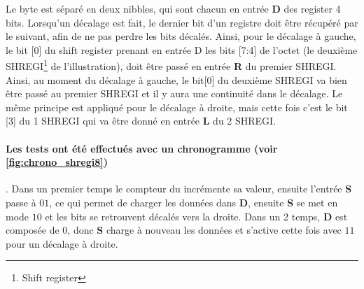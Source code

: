 \documentclass[a4paper]{article} %
\begin{document}
\begin{tcolorbox}[colframe=Monokaimagenta,colback=white]
Le byte est séparé en deux nibbles, qui sont chacun en entrée \textbf{D} des register 4 bits.
Lorsqu'un décalage est fait, le dernier bit d'un registre doit être récupéré par le suivant, afin de ne pas perdre les bits décalés. Ainsi, pour le décalage à gauche, le bit [0] du shift register prenant en entrée D les bits [7:4] de l'octet (le deuxième SHREGI\footnote{Shift register} de l'illustration), doit être passé en entrée \textbf{R} du premier SHREGI. Ainsi, au moment du décalage à gauche, le bit[0] du deuxième SHREGI va bien être passé au premier SHREGI et il y aura une continuité dans le décalage.
Le même principe est appliqué pour le décalage à droite, mais cette fois c'est le bit [3] du 1 SHREGI qui va être donné en entrée \textbf{L} du 2 SHREGI.

\paragraph{Les tests ont été effectués avec un chronogramme (voir \ref{fig:chrono_shregi8}) }. Dans un premier temps le compteur du incrémente sa valeur, ensuite l'entrée \textbf{S} passe à $01$, ce qui permet de charger les données dans \textbf{D}, ensuite \textbf{S} se met en mode $10$ et les bits se retrouvent décalés vers la droite. Dans un 2 temps, \textbf{D} est composée de $0$, donc \textbf{S} charge à nouveau les données et s'active cette fois avec $11$ pour un décalage à droite.
  
\end{tcolorbox}
\end{document}

